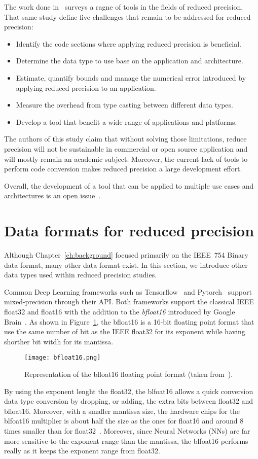 The work done in~\cite{Cherubin2020-tt} surveys a ragne of tools in the fields of reduced precision.
That same study define five challenges that remain to be addressed for reduced precision:
\begin{itemize}
	\item[1.] Identify the code sections where applying reduced precision is beneficial.
	\item[2.] Determine the data type to use base on the application and architecture.
	\item[3.] Estimate, quantify bounds and manage the numerical error introduced by applying reduced precision to an application.
	\item[4.] Measure the overhead from type casting between different data types.
	\item[5.] Develop a tool that benefit a wide range of applications and platforms.
\end{itemize}
The authors of this study claim that without solving those limitations, reduce 
precision will not be sustainable in commercial or open source application and 
will mostly remain an academic subject.
Moreover, the current lack of tools to perform code conversion makes reduced precision
a large development effort.

Overall, the development of a tool that can be applied to multiple use cases and
architectures is an open issue~\cite{Cherubin2020-tt}.

\section{Data formats for reduced precision}
\label{sc:rp-data-format}
Although Chapter~\ref{ch:background} focused primarily on the IEEE~754 Binary data format, many other data format exist.
In this section, we introduce other data types used within reduced precision studies.

Common Deep Learning frameworks such as Tensorflow~\cite{tensorflow2015-whitepaper} and Pytorch~\cite{PyTorch_2019} support mixed-precision through their API.
Both frameworks support the classical IEEE float32 and float16 with the addition to the \textit{bfloat16} introduced by Google Brain~\cite{bfloat16}.
As shown in Figure~\ref{fig:bfloat16}, the bfloat16 is a 16-bit floating point format that use
the same number of bit as the IEEE float32 for its exponent while having shorther bit witdh for its mantissa.
\begin{figure}[b]
	\centering
	\texttt{[image: bfloat16.png]}
	\caption{Representation of the bfloat16 floating point format (taken from~\cite{bfloat16}).}
	\label{fig:bfloat16}
\end{figure}
By using the exponent lenght the float32, the blfoat16 allows a quick conversion
data type conversion by dropping, or adding, the extra bits between float32 and bfloat16.
Moreover, with a smaller mantissa size, the hardware chips for the blfoat16 multiplier
is about half the size as the ones for float16 and around 8 times smaller than for float32~\cite{bfloat16}.
Moreover, since Neural Networks (NNs) are far more sensitive to the exponent range than the mantissa,
the blfoat16 performs really as it keeps the exponent range from float32.


